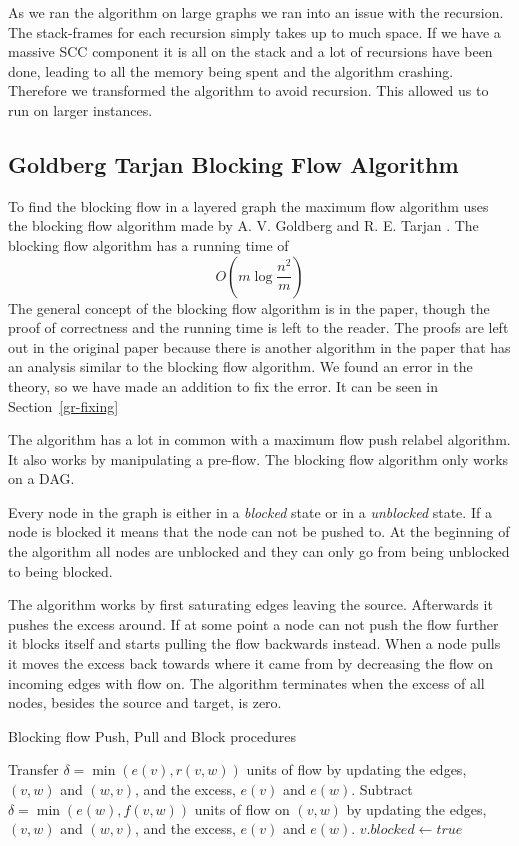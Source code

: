 As we ran the algorithm on large graphs we ran into an issue with the recursion. The stack-frames for each recursion simply takes up to much space.
If we have a massive SCC component it is all on the stack and a lot of recursions have been done, leading to all the memory being spent and
the algorithm crashing. Therefore we transformed the algorithm to avoid recursion. This
allowed us to run on larger instances.


\subsection{Goldberg Tarjan Blocking Flow Algorithm} \label{GR-BF}
To find the blocking flow in a layered graph the maximum flow algorithm uses the blocking flow algorithm made by A. V. Goldberg and R. E. Tarjan \cite{GoldbergTarjan1990}.
The blocking flow algorithm has a running time of $$O(m\log{\frac{n^2}{m}})$$
The general concept of the blocking flow algorithm is in the paper, though the proof of correctness and the running time is left to the reader. 
The proofs are left out in the original paper because there is another algorithm in the paper that has an analysis similar to the blocking flow algorithm.
We found an error in the theory, so we have made an addition to fix the error. It can be seen in Section~\ref{gr-fixing}

The algorithm has a lot in common with a maximum flow push relabel algorithm. It also works by manipulating a pre-flow.
The blocking flow algorithm only works on a DAG.

Every node in the graph is either in a \emph{blocked} state or in a \emph{unblocked} state. If a node is blocked it means that the node can not be pushed to. At
the beginning of the algorithm all nodes are unblocked and they can only go from being unblocked to being blocked.

The algorithm works by first saturating edges leaving the source. Afterwards it pushes the excess around. If at some point a node
can not push the flow further it blocks itself and starts pulling the flow backwards instead. When a node pulls it moves the excess back towards where it came from
by decreasing the flow on incoming edges with flow on. The algorithm terminates when the excess of all nodes, besides the source and target, is zero.

\begin{algorithm}
\caption{Blocking flow Push, Pull and Block procedures}\label{BFPushPullBlock}
\begin{algorithmic}[1]
\Statex
{}
	\State Transfer $\delta = \min{(e(v), r(v,w))}$ units of flow by updating the edges, $(v,w)$ and $(w,v)$, and the excess, $e(v)$ and $e(w)$.
\EndProcedure
\Statex
{}
	\State Subtract $\delta = \min{(e(w), f(v,w))}$ units of flow on $(v,w)$ by updating the edges, $(v,w)$ and $(w,v)$, and the excess, $e(v)$ and $e(w)$.
\EndProcedure
\Statex
{}
	\State $v.blocked \gets true$
\EndProcedure
\end{algorithmic}
\end{algorithm}

